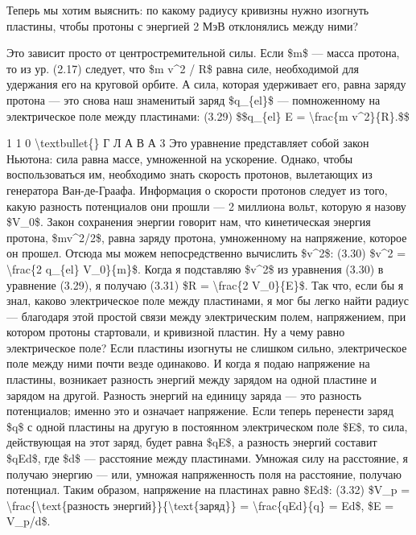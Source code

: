 \documentclass[10pt,oneside]{article}
\begin{document}
Теперь мы хотим выяснить: по какому радиусу кривизны нужно изогнуть пластины, чтобы протоны с энергией 2 МэВ отклонялись между ними?\par

Это зависит просто от центростремительной силы. Если \$m\$ --- масса протона, то из ур. (2.17) следует, что \$m v\textasciicircum{}2 / R\$ равна силе, необходимой для удержания его на круговой орбите. А сила, которая удерживает его, равна заряду протона --- это снова наш знаменитый заряд \$q\_\{el\}\$ --- помноженному на электрическое поле между пластинами: (3.29) \$\$q\_\{el\} E = \textbackslash{}frac\{m v\textasciicircum{}2\}\{R\}.\$\$\par

1 1 0 \textbackslash{}textbullet\{\} Г Л А В А  3 Это уравнение представляет собой закон Ньютона: сила равна массе, умноженной на ускорение. Однако, чтобы воспользоваться им, необходимо знать скорость протонов, вылетающих из генератора Ван-де-Граафа. Информация о скорости протонов следует из того, какую разность потенциалов они прошли --- 2 миллиона вольт, которую я назову \$V\_0\$. Закон сохранения энергии говорит нам, что кинетическая энергия протона, \$mv\textasciicircum{}2/2\$, равна заряду протона, умноженному на напряжение, которое он прошел. Отсюда мы можем непосредственно вычислить \$v\textasciicircum{}2\$: (3.30) \$v\textasciicircum{}2 = \textbackslash{}frac\{2 q\_\{el\} V\_0\}\{m\}\$. Когда я подставляю \$v\textasciicircum{}2\$ из уравнения (3.30) в уравнение (3.29), я получаю (3.31) \$R = \textbackslash{}frac\{2 V\_0\}\{E\}\$. Так что, если бы я знал, каково электрическое поле между пластинами, я мог бы легко найти радиус --- благодаря этой простой связи между электрическим полем, напряжением, при котором протоны стартовали, и кривизной пластин. Ну а чему равно электрическое поле? Если пластины изогнуты не слишком сильно, электрическое поле между ними почти везде одинаково. И когда я подаю напряжение на пластины, возникает разность энергий между зарядом на одной пластине и зарядом на другой. Разность энергий на единицу заряда --- это разность потенциалов; именно это и означает напряжение. Если теперь перенести заряд \$q\$ с одной пластины на другую в постоянном электрическом поле \$E\$, то сила, действующая на этот заряд, будет равна \$qE\$, а разность энергий составит \$qEd\$, где \$d\$ --- расстояние между пластинами. Умножая силу на расстояние, я получаю энергию --- или, умножая напряженность поля на расстояние, получаю потенциал. Таким образом, напряжение на пластинах равно \$Ed\$: (3.32) \$V\_p = \textbackslash{}frac\{\textbackslash{}text\{разность энергий\}\}\{\textbackslash{}text\{заряд\}\} = \textbackslash{}frac\{qEd\}\{q\} = Ed\$, \$E = V\_p/d\$.\par
\end{document}
